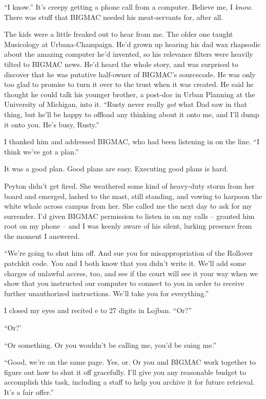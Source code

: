 “I know.” It's creepy getting a phone call from a computer. Believe 
me, I \emph{know}. There was stuff that BIGMAC needed his meat-servants 
for, after all.

The kids were a little freaked out to hear from me. The older one 
taught Musicology at Urbana-Champaign. He'd grown up hearing his dad 
wax rhapsodic about the amazing computer he'd invented, so his 
relevance filters were heavily tilted to BIGMAC news. He'd heard the 
whole story, and was surprised to discover that he was putative 
half-owner of BIGMAC's sourcecode. He was only too glad to promise to 
turn it over to the trust when it was created. He said he thought he 
could talk his younger brother, a post-doc in Urban Planning at the 
University of Michigan, into it. “Rusty never really \emph{got} what 
Dad saw in that thing, but he'll be happy to offload any thinking about 
it onto me, and I'll dump it onto you. He's busy, Rusty.”

I thanked him and addressed BIGMAC, who had been listening in on the 
line. “I think we've got a plan.”

\tb

It was a good plan. Good plans are easy. Executing good plans is hard.

Peyton didn't get fired. She weathered some kind of heavy-duty storm 
from her board and emerged, lashed to the mast, still standing, and 
vowing to harpoon the white whale across campus from her. She called me 
the next day to ask for my surrender. I'd given BIGMAC permission to 
listen in on my calls -- granted him root on my phone -- and I was 
keenly aware of his silent, lurking presence from the moment I answered.

“We're going to shut him off. And sue you for misappropriation of the 
Rollover patchkit code. You and I both know that you didn't write it. 
We'll add some charges of unlawful access, too, and see if the court 
will see it your way when we show that you instructed our computer to 
connect to you in order to receive further unauthorized instructions. 
We'll take you for everything.”

I closed my eyes and recited e to 27 digits in Lojban. “Or?”

“Or?'

“Or something. Or you wouldn't be calling me, you'd be suing me.”

“Good, we're on the same page. Yes, or. Or you and BIGMAC work 
together to figure out how to shut it off gracefully. I'll give you any 
reasonable budget to accomplish this task, including a staff to help 
you archive it for future retrieval. It's a fair offer.”

